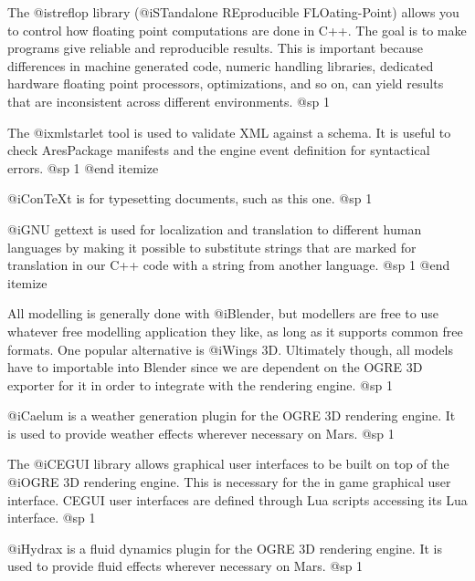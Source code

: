 \item
The @i{streflop} library (@i{STandalone REproducible FLOating-Point}) allows you to control how floating point computations are done in C++. The goal is to make programs give reliable and reproducible results. This is important because differences in machine generated code, numeric handling libraries, dedicated hardware floating point processors, optimizations, and so on, can yield results that are inconsistent across different environments.
@sp 1

\item
The @i{xmlstarlet} tool is used to validate XML against a schema. It is useful to check AresPackage manifests and the engine event definition for syntactical errors.
@sp 1
@end itemize



\itemize
\item
@i{ConTeXt} is for typesetting documents, such as this one.
@sp 1

\item
@i{GNU gettext} is used for localization and translation to different human languages by making it possible to substitute strings that are marked for translation in our C++ code with a string from another language.
@sp 1
@end itemize


\itemize
\item
All modelling is generally done with @i{Blender}, but modellers are free to use whatever free modelling application they like, as long as it supports common free formats. One popular alternative is @i{Wings 3D}. Ultimately though, all models have to importable into Blender since we are dependent on the OGRE 3D exporter for it in order to integrate with the rendering engine.
@sp 1

\item
@i{Caelum} is a weather generation plugin for the OGRE 3D rendering engine. It is used to provide weather effects wherever necessary on Mars.
@sp 1

\item
The @i{CEGUI} library allows graphical user interfaces to be built on top of the @i{OGRE 3D} rendering engine. This is necessary for the in game graphical user interface. CEGUI user interfaces are defined through Lua scripts accessing its Lua interface.
@sp 1

\item
@i{Hydrax} is a fluid dynamics plugin for the OGRE 3D rendering engine. It is used to provide fluid effects wherever necessary on Mars.
@sp 1

